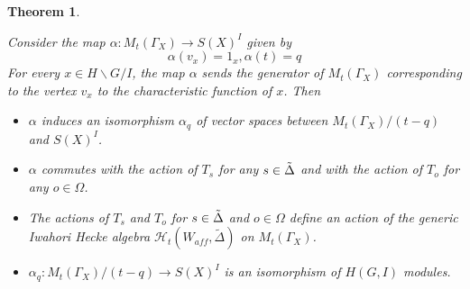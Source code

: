 \documentclass[12pt]{article}
\newcommand{\<}{\langle}
\renewcommand{\>}{\rangle}
\theoremstyle{plain}
\newtheorem{theorem}{Theorem}[section] %
\theoremstyle{definition}
\begin{document}
\begin{theorem}\label{generic}

Consider the map $\alpha: M_{t}(\Gamma_X) \to S(X)^I$ given by $$\alpha(v_x)=1_x, \alpha(t)=q$$  
For every $x\in H\backslash G/I$, the map $\alpha$ sends the generator of $M_t(\Gamma_X)$ corresponding to the vertex $v_x$ to the characteristic function of $x$. Then 
\begin{itemize}
    \item $\alpha$ induces an isomorphism $\alpha_{q}$ of vector spaces between $M_{t}(\Gamma_X)/(t-q)$ and $S(X)^I$.
    
    \item $\alpha$ commutes with the action of $T_s$ for any $s\in \Tilde{\Delta}$ and with the action of $T_o$ for any $o\in \Omega$.
    \item The actions of $T_s$ and $T_o$ for $s\in \Tilde{\Delta}$ and $o\in \Omega$ define an action of the generic Iwahori Hecke algebra $\mathcal{H}_{t}(W_{aff},\tilde{\Delta})$ on $M_{t}(\Gamma_X)$.
    \item $\alpha_{q}:M_{t}(\Gamma_X)/(t-q) \to S(X)^{I}$ is an isomorphism of $H(G,I)$ modules.
\end{itemize}
\end{theorem}
\end{document}

